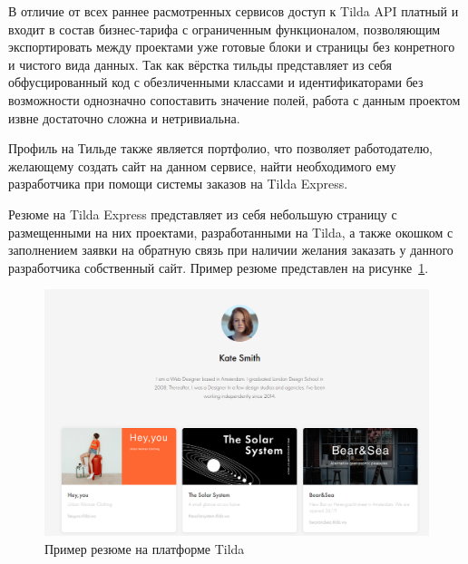 \documentclass[master, och, diploma]{SCWorks}
\begin{document}
В отличие от всех раннее расмотренных сервисов доступ к Tilda API платный и входит в состав бизнес-тарифа с ограниченным функционалом, позволяющим экспортировать между проектами уже готовые блоки и страницы без конретного и чистого вида данных. Так как вёрстка тильды представляет из себя обфусцированный код с обезличенными классами и идентификаторами без возможности однозначно сопоставить значение полей, работа с данным проектом извне достаточно сложна и нетривиальна.

Профиль на Тильде также является портфолио, что позволяет работодателю, желающему создать сайт на данном сервисе, найти необходимого ему разработчика при помощи системы заказов на Tilda Express.

Резюме на Tilda Express представляет из себя небольшую страницу с размещенными на них проектами, разработанными на Tilda, а также окошком с заполнением заявки на обратную связь при наличии желания заказать у данного разработчика собственный сайт. Пример резюме представлен на рисунке~\ref{fig:14}.
\begin{figure}[!ht]
    \centering
    \includegraphics[width=12cm]{images/image8.png}
    \caption{\label{fig:14}%
        Пример резюме на платформе Tilda}
\end{figure}

   
\end{document}
